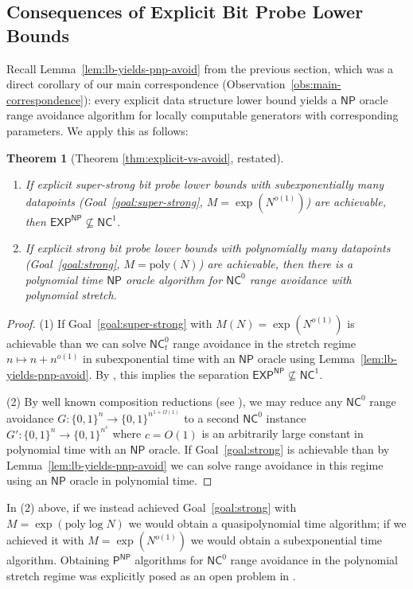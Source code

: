 \documentclass[11pt]{article}
\newtheorem*{theorem*}{Theorem}
\newcommand{\B}{\{0,1\}}
\newcommand{\poly}{\mathrm{poly}}
\begin{document}
\subsection{Consequences of Explicit Bit Probe Lower Bounds}\label{subsec:explicit-vs-avoid}
Recall Lemma~\ref{lem:lb-yields-pnp-avoid} from the previous section, which was a direct corollary of our main correspondence (Observation~\ref{obs:main-correspondence}): every explicit data structure lower bound yields a $\mathsf{NP}$ oracle range avoidance algorithm for locally computable generators with corresponding parameters.
We apply this as follows:
\begin{theorem*}[Theorem \ref{thm:explicit-vs-avoid}, restated]
~
\begin{enumerate}
    \item If explicit super-strong bit probe lower bounds with subexponentially many datapoints (Goal~\ref{goal:super-strong}, $M = \exp(N^{o(1)})$) are achievable, then $\mathsf{EXP^{NP}} \not\subseteq \mathsf{NC}^1$.
    \item If explicit strong bit probe lower bounds with polynomially many datapoints (Goal~\ref{goal:strong}, $M=\poly(N)$) are achievable, then there is a polynomial time $\mathsf{NP}$ oracle algorithm for $\mathsf{NC}^0$ range avoidance with polynomial stretch.
\end{enumerate}
\end{theorem*}
\begin{proof}
(1) If Goal~\ref{goal:super-strong} with $M(N) = \exp(N^{o(1)})$ is achievable than we can solve $\mathsf{NC}^0_t$ range avoidance in the stretch regime $n \mapsto n + n^{o(1)}$ in subexponential time with an $\mathsf{NP}$ oracle using Lemma~\ref{lem:lb-yields-pnp-avoid}. By \cite{RSW}, this implies the separation $\mathsf{EXP^{NP}} \not\subseteq \mathsf{NC}^1$.

(2) By well known composition reductions (see \cite{Korten}), we may reduce any $\mathsf{NC}^0$ range avoidance $G: \B^n \to \B^{n^{1+ \Omega(1)}}$ to a second $\mathsf{NC}^0$ instance $G': \B^n \to \B^{n^c}$ where $c=O(1)$ is an arbitrarily large constant in polynomial time with an $\mathsf{NP}$ oracle. If Goal~\ref{goal:strong} is achievable than by Lemma~\ref{lem:lb-yields-pnp-avoid} we can solve range avoidance in this regime using an $\mathsf{NP}$ oracle in polynomial time.
\end{proof}

In (2) above, if we instead achieved Goal~\ref{goal:strong} with $M = \exp(\poly \log N)$ we would obtain a quasipolynomial time algorithm; if we achieved it with $M=\exp(N^{o(1)})$ we would obtain a subexponential time algorithm. Obtaining $\mathsf{P^{NP}}$ algorithms for $\mathsf{NC}^0$ range avoidance in the polynomial stretch regime was explicitly posed as an open problem in \cite{RSW}.
\end{document}
